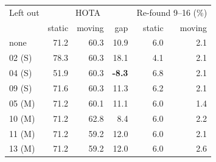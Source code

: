 \begin{tabular}{lrrrrr}
\toprule
Left out & \multicolumn{3}{c}{HOTA} & \multicolumn{2}{c}{Re-found 9--16 (\%)} \\
 & static & moving & gap & static & moving \\
\midrule
none & 71.2 & 60.3 & 10.9 & 6.0 & 2.1 \\
\midrule
02 (S) & 78.3 & 60.3 & 18.1 & 4.1 & 2.1 \\
04 (S) & 51.9 & 60.3 & \textbf{-8.3} & 6.8 & 2.1 \\
09 (S) & 71.6 & 60.3 & 11.3 & 6.2 & 2.1 \\
05 (M) & 71.2 & 60.1 & 11.1 & 6.0 & 1.4 \\
10 (M) & 71.2 & 62.8 & 8.4 & 6.0 & 2.2 \\
11 (M) & 71.2 & 59.2 & 12.0 & 6.0 & 2.1 \\
13 (M) & 71.2 & 59.2 & 12.0 & 6.0 & 2.6 \\
\bottomrule
\end{tabular}

